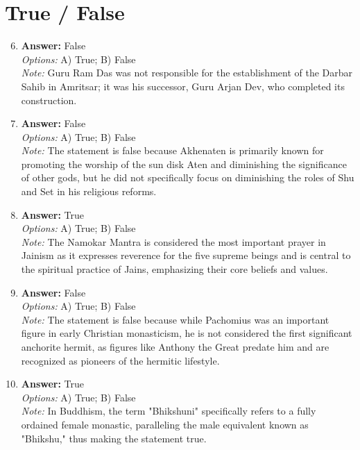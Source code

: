 \documentclass[12pt]{article}
\begin{document}
\section*{True / False}
\begin{enumerate}[label=\arabic*.]
\setcounter{enumi}{5}
\item \textbf{Answer:} False
\\ \textit{Options:} A) True; B) False
\\ \textit{Note:} Guru Ram Das was not responsible for the establishment of the Darbar Sahib in Amritsar; it was his successor, Guru Arjan Dev, who completed its construction.
\item \textbf{Answer:} False
\\ \textit{Options:} A) True; B) False
\\ \textit{Note:} The statement is false because Akhenaten is primarily known for promoting the worship of the sun disk Aten and diminishing the significance of other gods, but he did not specifically focus on diminishing the roles of Shu and Set in his religious reforms.
\item \textbf{Answer:} True
\\ \textit{Options:} A) True; B) False
\\ \textit{Note:} The Namokar Mantra is considered the most important prayer in Jainism as it expresses reverence for the five supreme beings and is central to the spiritual practice of Jains, emphasizing their core beliefs and values.
\item \textbf{Answer:} False
\\ \textit{Options:} A) True; B) False
\\ \textit{Note:} The statement is false because while Pachomius was an important figure in early Christian monasticism, he is not considered the first significant anchorite hermit, as figures like Anthony the Great predate him and are recognized as pioneers of the hermitic lifestyle.
\item \textbf{Answer:} True
\\ \textit{Options:} A) True; B) False
\\ \textit{Note:} In Buddhism, the term "Bhikshuni" specifically refers to a fully ordained female monastic, paralleling the male equivalent known as "Bhikshu," thus making the statement true.
\end{enumerate}
\end{document}
